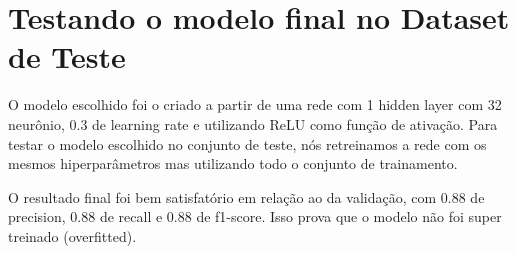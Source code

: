 \documentclass[conference]{IEEEtran}
\begin{document}
\section{Testando o modelo final no Dataset de Teste}

	O modelo escolhido foi o criado a partir de uma rede com 1 hidden layer com 32 neurônio, 0.3 de learning rate e utilizando ReLU como função de ativação.	Para testar o modelo escolhido no conjunto de teste, nós retreinamos a rede com os mesmos hiperparâmetros mas utilizando todo o conjunto de trainamento. 
	
	O resultado final foi bem satisfatório em relação ao da validação, com $0.88$ de precision, $0.88$ de recall e $0.88$ de f1-score. Isso prova que o modelo não foi super treinado (overfitted).

\printbibliography
\end{document}
